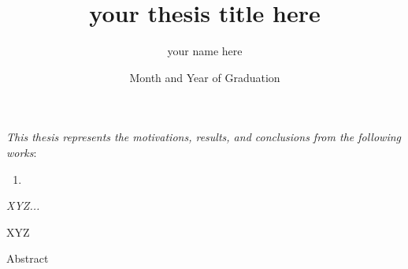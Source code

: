 \documentclass{ucetd}
\title{your thesis title here}
\author{your name here}
\date{Month and Year of Graduation}  %
\begin{document}
\maketitle

\makecopyright
\makededication

\tableofcontents
\cleardoublepage
{}
\listoffigures
\cleardoublepage
{}
\listoftables
\newpage

\begin{center}
    \textit{This thesis represents the motivations, results, and conclusions from the following works}:
    \\
    \begin{enumerate}

        \item[] 
    \end{enumerate}

\end{center}
\newpage
 
\acknowledgments
\begin{center}
    \textit{XYZ...}
\end{center}

XYZ

\abstract
Abstract


\mainmatter







\appendix







\end{document}
